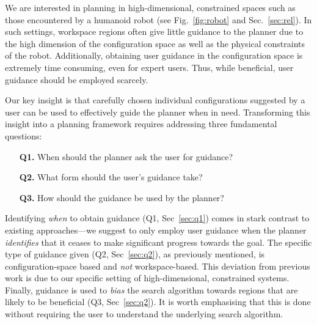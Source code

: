 \documentclass{article}
\begin{document}
We are interested in planning in high-dimensional, constrained spaces such as those encountered by a humanoid robot (see Fig.~\ref{fig:robot} and Sec.~\ref{sec:rel}).
In such settings, workspace regions often give little guidance to the planner due to the high dimension of the configuration space as well as the physical constraints of the robot.
Additionally, obtaining user guidance in the configuration space is extremely time consuming, even for expert users.
Thus,  while beneficial, user guidance should be employed scarcely.

Our key insight is that carefully chosen individual configurations suggested by a user can be used to effectively guide the planner when in need.
Transforming this insight into a planning framework requires addressing three fundamental questions:

\begin{itemize}
	\item[\textbf{Q1.}] When should the planner ask the user for guidance?
	\item[\textbf{Q2.}] What form should the user's guidance take?
	\item[\textbf{Q3.}] How should the guidance be used by the planner?
\end{itemize}

Identifying \emph{when} to obtain guidance 
(Q1, Sec~\ref{sec:q1}) 
comes in stark contrast to existing approaches---we suggest to only employ user guidance when the planner \emph{identifies} that it ceases to make significant progress towards the goal.
The specific type of guidance given 
(Q2, Sec~\ref{sec:q2}),
as previously mentioned,
is configuration-space based and \emph{not} workspace-based. This deviation from previous work is due to our specific setting of high-dimensional, constrained systems.
Finally, guidance is used to \emph{bias} the search algorithm towards regions that are likely to be beneficial (Q3, Sec~\ref{sec:q2}). 
It is worth emphasising that this is done without requiring the user to understand the underlying search algorithm. 

% 
\end{document}
